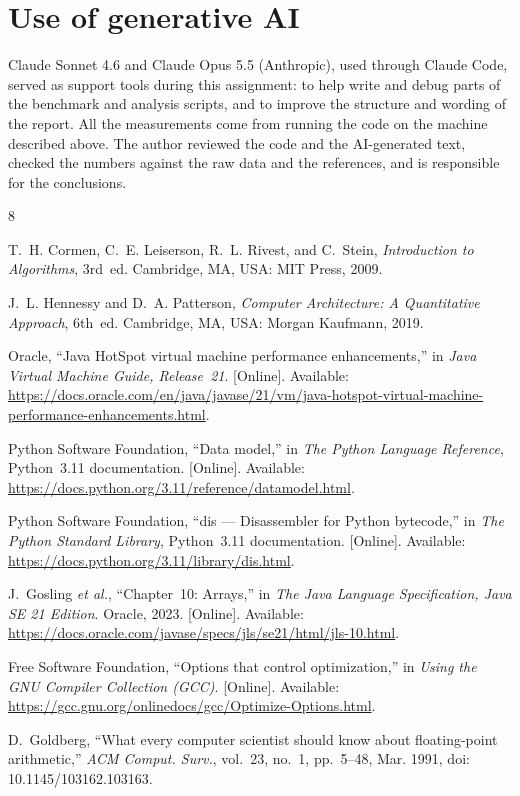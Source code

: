 \documentclass[12pt,a4paper]{article}
\begin{document}
\section*{Use of generative AI}

Claude Sonnet 4.6 and Claude Opus 5.5 (Anthropic), used through Claude Code, served as
support tools during this assignment: to help write and debug parts of the benchmark and
analysis scripts, and to improve the structure and wording of the report. All the
measurements come from running the code on the machine described above. The author
reviewed the code and the AI-generated text, checked the numbers against the raw data and
the references, and is responsible for the conclusions.

\clearpage
{\small
\begin{thebibliography}{8}

T.~H. Cormen, C.~E. Leiserson, R.~L. Rivest, and C.~Stein, \textit{Introduction to
Algorithms}, 3rd~ed. Cambridge, MA, USA: MIT Press, 2009.

J.~L. Hennessy and D.~A. Patterson, \textit{Computer Architecture: A Quantitative
Approach}, 6th~ed. Cambridge, MA, USA: Morgan Kaufmann, 2019.

Oracle, ``Java HotSpot virtual machine performance enhancements,'' in \textit{Java
Virtual Machine Guide, Release~21}. [Online]. Available:
\url{https://docs.oracle.com/en/java/javase/21/vm/java-hotspot-virtual-machine-performance-enhancements.html}.

Python Software Foundation, ``Data model,'' in \textit{The Python Language Reference},
Python~3.11 documentation. [Online]. Available:
\url{https://docs.python.org/3.11/reference/datamodel.html}.

Python Software Foundation, ``dis --- Disassembler for Python bytecode,'' in \textit{The
Python Standard Library}, Python~3.11 documentation. [Online]. Available:
\url{https://docs.python.org/3.11/library/dis.html}.

J.~Gosling \textit{et al.}, ``Chapter~10: Arrays,'' in \textit{The Java Language
Specification, Java SE 21 Edition}. Oracle, 2023. [Online]. Available:
\url{https://docs.oracle.com/javase/specs/jls/se21/html/jls-10.html}.

Free Software Foundation, ``Options that control optimization,'' in \textit{Using the GNU
Compiler Collection (GCC)}. [Online]. Available:
\url{https://gcc.gnu.org/onlinedocs/gcc/Optimize-Options.html}.

D.~Goldberg, ``What every computer scientist should know about floating-point
arithmetic,'' \textit{ACM Comput. Surv.}, vol.~23, no.~1, pp.~5--48, Mar. 1991,
doi: 10.1145/103162.103163.

\end{thebibliography}
}
\end{document}
